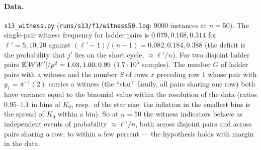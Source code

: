 \paragraph{Data.}  \texttt{s13\_witness.py} (\texttt{runs/s13/f1/witness50.log}:
$9000$ instances at $n=50$).  The single-pair witness frequency for
ladder pairs is $0.079,0.168,0.314$ for $\ell'=5,10,20$ against
$(\ell'-1)/(n-1)=0.082,0.184,0.388$ (the deficit is the probability
that $j'$ lies on the short cycle, $\approx\ell'/n$).  For two
disjoint ladder pairs $\mathbb{E}[WW']/p^2=1.03,1.00,0.99$ ($1.7\cdot10^5$
samples).  The number $G$ of ladder pairs with a witness and the number
$S$ of rows $x$ preceding row $1$ whose pair with $y_1=\pi^{-1}(2)$
carries a witness (the ``star'' family, all pairs sharing one row)
both have variance equal to the binomial value within the resolution
of the data (ratios $0.95$--$1.1$ in bins of $K_0$, resp.\ of the star
size; the inflation in the smallest bins is the spread of $K_0$ within
a bin).  So at $n=50$ the witness indicators behave as independent
events of probability $\approx\ell'/n$, both across disjoint pairs and
across pairs sharing a row, to within a few percent --- the hypothesis
holds with margin in the data.

